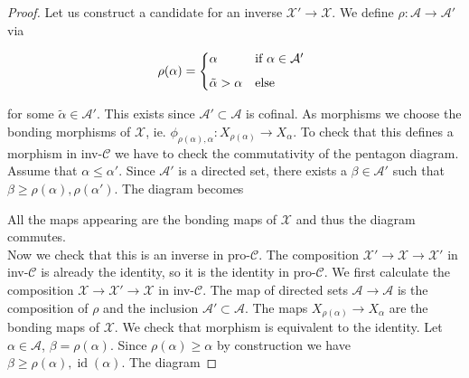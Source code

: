 \documentclass[a4paper,11pt]{article}
\theoremstyle{definition}
\theoremstyle{plain}
\theoremstyle{remark}
\DeclareMathOperator{\id}{id}
\begin{document}
{\begin{proof} Let us construct a candidate for an inverse $\mathcal{X}'\rightarrow \mathcal{X}$. We define $\rho:\mathcal{A}\rightarrow \mathcal{A}'$ via

\[
\rho(\alpha)=
\begin{dcases*}
\alpha
   & if  $\alpha\in \mathcal{A}'$\, \\[1ex]
\tilde{\alpha}> \alpha
   & else\,
\end{dcases*}
\]

for some $\tilde{\alpha}\in \mathcal{A}'$. This exists since $\mathcal{A}'\subset \mathcal{A}$ is cofinal. As morphisms we choose the bonding morphisms of $\mathcal{X}$, ie. $\phi_{\rho(\alpha),\alpha}: X_{\rho(\alpha)}\rightarrow X_{\alpha}$. To check that this defines a morphism in inv-$\mathcal{C}$ we have to check the commutativity of the pentagon diagram. Assume that $\alpha\leq \alpha'$. Since $\mathcal{A}'$ is a directed set, there exists a $\beta\in \mathcal{A}'$ such that $\beta\geq \rho(\alpha), \rho(\alpha')$. The diagram becomes

\begin{figure}[H]
\center
{}
 \end{figure}
 
 All the maps appearing are the bonding maps of $\mathcal{X}$ and thus the diagram commutes. \\
 
Now we check that this is an inverse in pro-$\mathcal{C}$. The composition $\mathcal{X}'\rightarrow\mathcal{X}\rightarrow \mathcal{X}'$ in inv-$\mathcal{C}$ is already the identity, so it is the identity in pro-$\mathcal{C}$. We first calculate the composition $\mathcal{X}\rightarrow\mathcal{X}'\rightarrow \mathcal{X}$ in inv-$\mathcal{C}$. The map of directed sets $\mathcal{A}\rightarrow \mathcal{A}$ is the composition of $\rho$ and the inclusion $\mathcal{A}'\subset \mathcal{A}$. The maps $X_{\rho(\alpha)}\rightarrow X_{\alpha}$ are the bonding maps of $\mathcal{X}$. We check that morphism is equivalent to the identity. Let $\alpha\in \mathcal{A}$, $\beta = \rho(\alpha)$. Since $\rho(\alpha)\geq \alpha$ by construction we have $\beta\geq \rho(\alpha), \id(\alpha)$. The diagram





\end{proof}}
\end{document}
